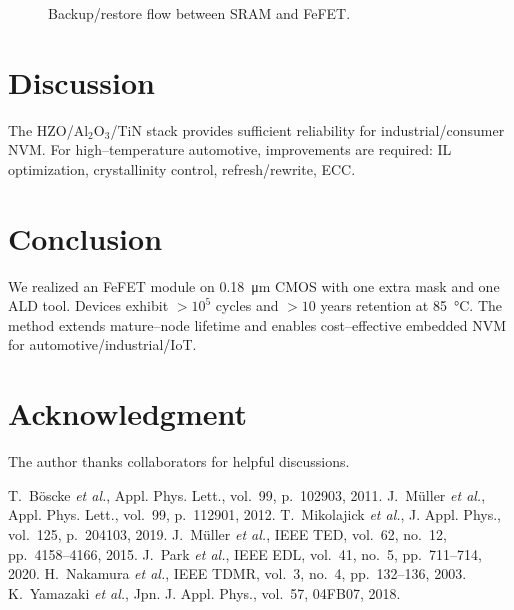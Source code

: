 \documentclass[conference]{IEEEtran}
\begin{document}
\begin{figure}[t]
\centering
{}
\caption{Backup/restore flow between SRAM and FeFET.}
\label{fig:backup}
\end{figure}

\section{Discussion}
The HZO/Al\(_2\)O\(_3\)/TiN stack provides sufficient reliability for industrial/consumer NVM. 
For high–temperature automotive, improvements are required: IL optimization, crystallinity control, refresh/rewrite, ECC.

\section{Conclusion}
We realized an FeFET module on \SI{0.18}{\micro m} CMOS with one extra mask and one ALD tool. 
Devices exhibit \(>\!10^{5}\) cycles and \(>\!10\) years retention at \SI{85}{\celsius}. 
The method extends mature–node lifetime and enables cost–effective embedded NVM for automotive/industrial/IoT.

\section*{Acknowledgment}
The author thanks collaborators for helpful discussions.

\begin{thebibliography}{99}
 T.~Böscke \emph{et al.}, Appl. Phys. Lett., vol.~99, p.~102903, 2011.
 J.~Müller \emph{et al.}, Appl. Phys. Lett., vol.~99, p.~112901, 2012.
 T.~Mikolajick \emph{et al.}, J. Appl. Phys., vol.~125, p.~204103, 2019.
 J.~Müller \emph{et al.}, IEEE TED, vol.~62, no.~12, pp.~4158--4166, 2015.
 J.~Park \emph{et al.}, IEEE EDL, vol.~41, no.~5, pp.~711--714, 2020.
 H.~Nakamura \emph{et al.}, IEEE TDMR, vol.~3, no.~4, pp.~132--136, 2003.
 K.~Yamazaki \emph{et al.}, Jpn. J. Appl. Phys., vol.~57, 04FB07, 2018.
\end{thebibliography}
\end{document}
